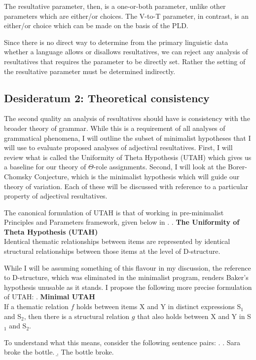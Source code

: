 \documentclass[MilwayThesis]{subfiles}
\begin{document}
The resultative parameter, then, is a one-or-both parameter, unlike other parameters which are either/or choices.
The V-to-T parameter, in contrast, is an either/or choice which can be made on the basis of the PLD.

Since there is no direct way to determine from the primary linguistic data whether a language allows or disallows resultatives, we can reject any analysis of resultatives that requires the parameter to be directly set.
Rather the setting of the resultative parameter must be determined indirectly.

\subsection{Desideratum 2: Theoretical consistency}
The second quality an analysis of resultatives should have is consistency with the broader theory of grammar.
While this is a requirement of all analyses of grammatical phenomena, I will outline the subset of minimalist hypotheses that I will use to evaluate proposed analyses of adjectival resultatives.
First, I will review what is called the Uniformity of Theta Hypothesis (UTAH) which gives us a baseline for our theory of $\Theta$-role assignments.
Second, I will look at the Borer-Chomsky Conjecture, which is the minimalist hypothesis which will guide our theory of variation.
Each of these will be discussed with reference to a particular property of adjectival resultatives.

The canonical formulation of UTAH is that of \textcite{baker1988incorporation} working in pre-minimalist Principles and Parameters framework, given below in \Next.
\ex. \textbf{The Uniformity of Theta Hypothesis (UTAH)}\\
Identical thematic relationships between items are represented by identical structural relationships between those items at the level of D-structure. \parencite[46]{baker1988incorporation}

While I will be assuming something of this flavour in my discussion, the reference to D-structure, which was eliminated in the minimalist program, renders Baker's hypothesis unusable as it stands.
I propose the following more precise formulation of UTAH:
\ex. \textbf{Minimal UTAH}\\
If a thematic relation $f$ holds between items X and Y in distinct expressions S$_1$ and S$_2$, then there is a structural relation $g$ that also holds between X and Y in S$_1$ and S$_2$.

To understand what this means, consider the following sentence pairs:
\ex. \label{ex:broke-bottle}
\a. Sara broke the bottle.
\b. The bottle broke.
\end{document}
